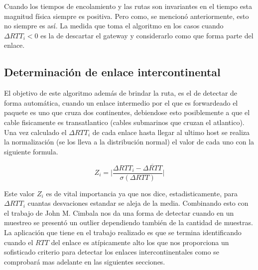 Cuando los tiempos de encolamiento y las rutas son invariantes en el tiempo
esta magnitud física siempre es positiva. Pero como, se mencionó anteriormente, esto
no siempre es así. La medida que toma el algoritmo en los casos cuando
$\Delta RTT_{i} < 0$ es la de descartar el
gateway y considerarlo como que forma parte del enlace.

\subsection{Determinación de enlace intercontinental}

El objetivo de este algoritmo además de brindar la ruta, es el de detectar de
forma automática, cuando un enlace intermedio por el que es forwardeado el
paquete es uno que cruza dos continentes, debiendose esto posiblemente a
que el cable fisicamente es transatlantico (cables submarinos que cruzan el
atlantico). Una vez calculado el $\Delta RTT_{i}$ de cada enlace hasta llegar
al ultimo host se realiza la normalización (se los lleva a la distribución normal)
el valor de cada uno con la siguiente formula.

\begin{equation}\label{eq:z}
	Z_{i} = \lvert\frac{\Delta RTT_{i} - \overline{\Delta RTT}}{\sigma \left(\Delta RTT \right)}\rvert
\end{equation}

Este valor $Z_{i}$ es de vital importancia ya que nos dice, estadisticamente,
para $\Delta RTT_{i}$ cuantas desvaciones estandar se aleja de la media.
Combinando esto con el trabajo de John M. Cimbala\cite{cimbala} nos da una forma de
detectar cuando en un muestreo se presentó un outlier dependiendo también de la
cantidad de muestras. La aplicación que tiene en el trabajo realizado es que se
termina identificando cuando el $RTT$ del enlace es atípicamente alto los que nos
proporciona un sofisticado criterio para detectar los enlaces
intercontinentales como se comprobará mas adelante en las siguientes secciones.
